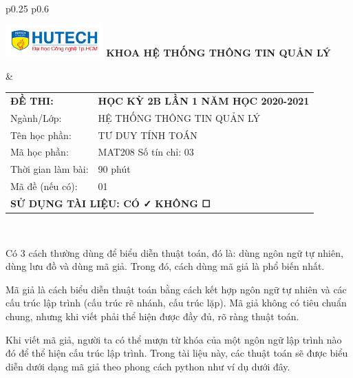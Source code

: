 \documentclass[a4paper]{article}
\begin{document}
{\ssp \begin{center}
    \begin{tabular}{p{0.25\linewidth} p{0.6\linewidth}}
        \begin{center}
            \includegraphics[height = 1.2cm]{hutech.png} \newline
            \textbf{KHOA HỆ THỐNG THÔNG TIN QUẢN LÝ}
        \end{center}
        &
        \begin{center}
            \begin{tabular}[t]{l l}
                \textbf{ĐỀ THI:} &\textbf{HỌC KỲ 2B LẦN 1 NĂM HỌC 2020-2021} \\
                Ngành/Lớp: &HỆ THỐNG THÔNG TIN QUẢN LÝ \\
                Tên học phần: &TƯ DUY TÍNH TOÁN \\
                Mã học phần: &MAT208 \hspace{2em} Số tín chỉ: 03 \\
                Thời gian làm bài: &90 phút \\
                Mã đề (nếu có): & 01 \\
                \multicolumn{2}{l}{\textbf{SỬ DỤNG TÀI LIỆU:\hspace{1em} CÓ ✓\hspace{1em} KHÔNG ☐}}\\
            \end{tabular}
        \end{center}
        \\
        \hline
    \end{tabular}
\end{center}
}
Có 3 cách thường dùng để biểu diễn thuật toán, đó là: dùng ngôn ngữ tự nhiên, dùng lưu đồ và dùng mã giả.
    Trong đó, cách dùng mã giả là phổ biến nhất.

    Mã giả là cách biểu diễn thuật toán bằng cách kết hợp ngôn ngữ tự nhiên và các cấu trúc lập trình (cấu trúc rẽ nhánh, cấu trúc lặp).
    Mã giả không có tiêu chuẩn chung, nhưng khi viết phải thể hiện được đầy đủ, rõ ràng thuật toán.

    Khi viết mã giả, người ta có thể mượn từ khóa của một ngôn ngữ lập trình nào đó để thể hiện cấu trúc lập trình.
    Trong tài liệu này, các thuật toán sẽ được biểu diễn dưới dạng mã giả theo phong cách python như ví dụ dưới đây.
\end{document}
